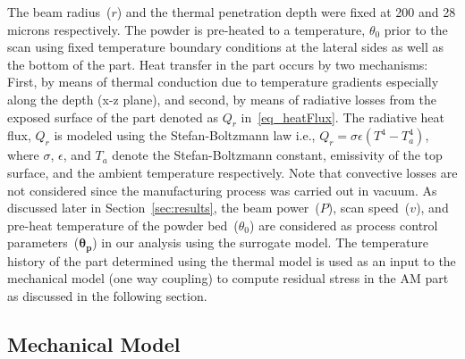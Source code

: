 The beam radius~($r$) and the thermal penetration depth were fixed at 200 and 28
microns respectively. The powder is pre-heated to a temperature, $\theta_0$ prior to the scan using fixed temperature
boundary conditions at the lateral sides as well as the bottom of the part. Heat transfer in the part occurs by two
mechanisms: First, by means of thermal conduction due to temperature gradients especially along the depth (x-z plane),
and second, by means of radiative losses from the exposed surface of the part denoted as $Q_r$ in~\eqref{eq_heatFlux}.
The radiative heat flux, $Q_r$ is modeled using the Stefan-Boltzmann law i.e., $Q_r=\sigma\epsilon(T^4-T_a^4)$, where
$\sigma$, $\epsilon$, and $T_a$ denote the Stefan-Boltzmann constant, emissivity of the top surface, and the ambient
temperature respectively. Note that convective losses are not considered since the manufacturing process was
carried out in vacuum. As discussed later in Section~\ref{sec:results}, the beam power~($P$), scan speed~($v$), and 
pre-heat temperature of the powder bed~($\theta_0$) are considered as process control parameters~($\bm{\theta_p}$)
in our analysis using the surrogate model. The temperature history of the part determined using the thermal model
is used as an input to the mechanical model (one way coupling) to compute residual stress in the AM part as 
discussed in the following section. 

\subsection{Mechanical Model}
\label{sub:mech}

